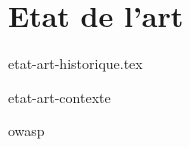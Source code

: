 \part{Etat de l'art}

\parttoc %

%

%
{etat-art-historique.tex}

% 
{etat-art-contexte}

% 
{owasp}
